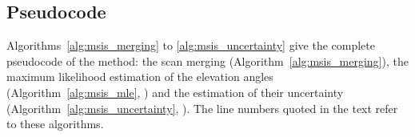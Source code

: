 
\clearpage                               %
\subsection{Pseudocode}                  %
\label{sec:msis_pseudocode}              %

Algorithms~\ref{alg:msis_merging} to \ref{alg:msis_uncertainty} give the complete pseudocode of the
method: the scan merging (Algorithm~\ref{alg:msis_merging}), the maximum likelihood estimation of the
elevation angles (Algorithm~\ref{alg:msis_mle}, ) and the estimation of their
uncertainty (Algorithm~\ref{alg:msis_uncertainty}, ). The line numbers
quoted in the text refer to these algorithms.

